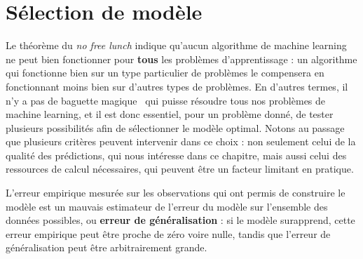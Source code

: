 

\section{Sélection de modèle}
Le théorème du \textit{no free lunch} %
indique qu'aucun
algorithme de machine learning ne peut bien fonctionner pour \textbf{tous} les
problèmes d'apprentissage : un algorithme qui fonctionne bien sur un type
particulier de problèmes le compensera en fonctionnant moins bien sur d'autres
types de problèmes. En d'autres termes, il n'y a pas de \og baguette magique
\fg~qui puisse résoudre tous nos problèmes de machine learning, et il est donc
essentiel, pour un problème donné, de tester plusieurs possibilités afin de
sélectionner le modèle optimal. Notons au passage que plusieurs critères
peuvent intervenir dans ce choix : non seulement celui de la qualité des
prédictions, qui nous intéresse dans ce chapitre, mais aussi celui des
ressources de calcul nécessaires, qui peuvent être un facteur limitant en
pratique.

L'erreur empirique mesurée sur les observations qui ont permis de construire le
modèle est un mauvais estimateur de l'erreur du modèle sur l'ensemble des
données possibles, ou \textbf{erreur de généralisation} : si le modèle
surapprend, cette erreur empirique peut être proche de zéro voire nulle,
tandis que l'erreur de généralisation peut être arbitrairement grande.

